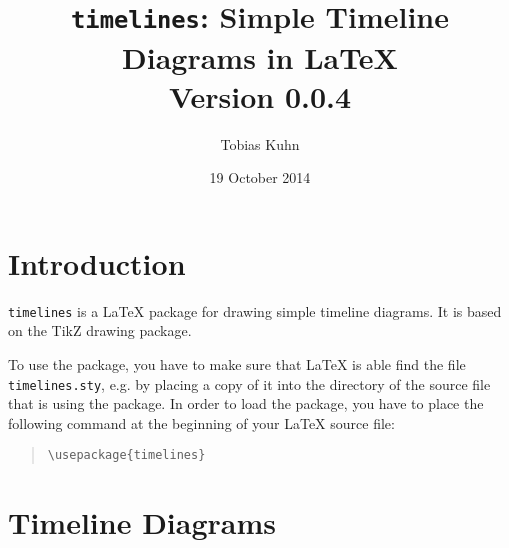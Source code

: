 \documentclass{article}
\title{
  \texttt{timelines}: Simple Timeline Diagrams in \LaTeX
  \medskip\\
  \large Version 0.0.4
}
\author{Tobias Kuhn}
\date{19 October 2014}
\begin{document}
\maketitle


\section{Introduction}

\texttt{timelines} is a {\LaTeX} package for drawing simple timeline diagrams. It is based on the TikZ drawing package.

To use the package, you have to make sure that {\LaTeX} is able find the file \texttt{timelines.sty}, e.g. by placing a copy of it into the directory of the source file that is using the package. In order to load the package, you have to place the following command at the beginning of your {\LaTeX} source file:
\begin{quote}\small
\begin{verbatim}
\usepackage{timelines}
\end{verbatim}
\end{quote}

\section{Timeline Diagrams}
\end{document}
